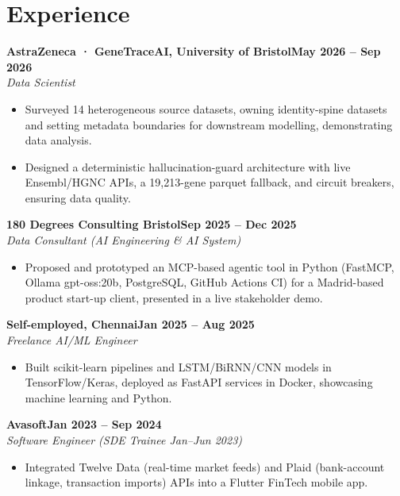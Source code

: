 \documentclass[a4paper,10pt]{article}
\newcommand{\entry}[4]{\noindent\textbf{#1}\hfill\textbf{#2}\\ \textit{#3}\hfill\textit{#4}\par}
\begin{document}
\section{Experience}
\entry{AstraZeneca · GeneTraceAI, University of Bristol}{May 2026 – Sep 2026}{Data Scientist}{}
\begin{itemize}
  \item Surveyed 14 heterogeneous source datasets, owning identity-spine datasets and setting metadata boundaries for downstream modelling, demonstrating data analysis.
  \item Designed a deterministic hallucination-guard architecture with live Ensembl/HGNC APIs, a 19,213-gene parquet fallback, and circuit breakers, ensuring data quality.
\end{itemize}
\vspace{3pt}
\entry{180 Degrees Consulting Bristol}{Sep 2025 – Dec 2025}{Data Consultant (AI Engineering \& AI System)}{}
\begin{itemize}
  \item Proposed and prototyped an MCP-based agentic tool in Python (FastMCP, Ollama gpt-oss:20b, PostgreSQL, GitHub Actions CI) for a Madrid-based product start-up client, presented in a live stakeholder demo.
\end{itemize}
\vspace{3pt}
\entry{Self-employed, Chennai}{Jan 2025 – Aug 2025}{Freelance AI/ML Engineer}{}
\begin{itemize}
  \item Built scikit-learn pipelines and LSTM/BiRNN/CNN models in TensorFlow/Keras, deployed as FastAPI services in Docker, showcasing machine learning and Python.
\end{itemize}
\vspace{3pt}
\entry{Avasoft}{Jan 2023 – Sep 2024}{Software Engineer (SDE Trainee Jan–Jun 2023)}{}
\begin{itemize}
  \item Integrated Twelve Data (real-time market feeds) and Plaid (bank-account linkage, transaction imports) APIs into a Flutter FinTech mobile app.
\end{itemize}

\end{document}
